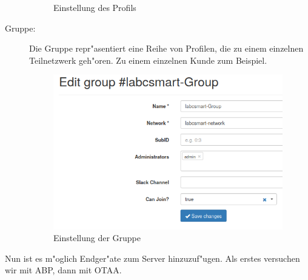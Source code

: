 \begin{description}
	\begin{figure}[h!]
		\centering
		\caption{Einstellung des Profils}
	\end{figure}
	
	\item[Gruppe:] Die Gruppe repr"asentiert eine Reihe von Profilen,
	die zu einem einzelnen Teilnetzwerk geh"oren. Zu einem einzelnen
	Kunde zum Beispiel.
	\begin{figure}[h]
		\centering
		\includegraphics[width=10cm]{source/images/Labcsmart_group}
		\caption{Einstellung der Gruppe\label{fig:group}}
	\end{figure}
\end{description}
\vspace{10cm}
Nun ist es m"oglich Endger"ate zum Server hinzuzuf"ugen. Als erstes
versuchen wir mit ABP, dann mit OTAA.

